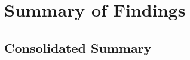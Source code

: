 \section{Summary of Findings}
\label{sec:results:summary}

\subsection{Consolidated Summary}
\label{sec:results:gallery:summary}
